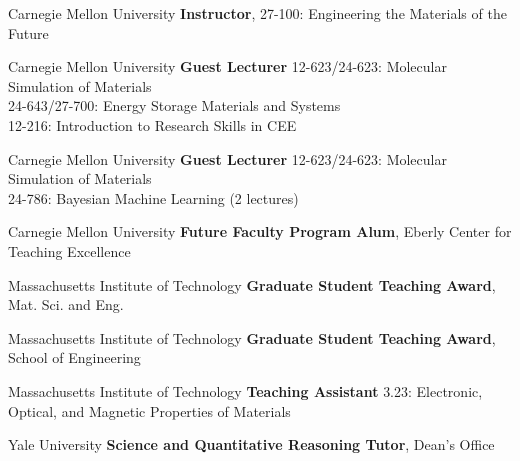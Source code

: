     {Carnegie Mellon University}
    {\textbf{Instructor}, 27-100: Engineering the Materials of the Future}{}

\vspace{-3mm}
    {Carnegie Mellon University}
    {\textbf{Guest Lecturer}}
    {12-623/24-623: Molecular Simulation of Materials\\
    24-643/27-700: Energy Storage Materials and Systems\\
    12-216: Introduction to Research Skills in CEE}

\vspace{-3mm}
    {Carnegie Mellon University}
    {\textbf{Guest Lecturer}}
    {12-623/24-623: Molecular Simulation of Materials\\
    24-786: Bayesian Machine Learning (2 lectures)}

\vspace{2.2mm}
\datedsubsectionnarrow{}
    {Carnegie Mellon University}
    {\textbf{Future Faculty Program Alum}, Eberly Center for Teaching Excellence}{}

\vspace{2.2mm}
    {Massachusetts Institute of Technology}
    {\textbf{Graduate Student Teaching Award}, Mat. Sci. and Eng.}{}

\datedsubsectionnarrow{}
    {Massachusetts Institute of Technology}
    {\textbf{Graduate Student Teaching Award}, School of Engineering}{}

\vspace{-3mm}
    {Massachusetts Institute of Technology}
    {\textbf{Teaching Assistant}}
    {3.23: Electronic, Optical, and Magnetic Properties of Materials}

\vspace{2.2mm}
    {Yale University}
    {\textbf{Science and Quantitative Reasoning Tutor}, Dean's Office}{}